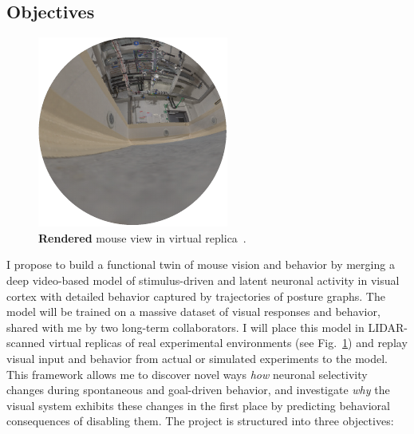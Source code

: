 \documentclass[COG,11pt]{ercgrant}
\begin{document}
\subsection{Objectives}
\begin{figure}
\vspace{-4ex}
\includegraphics[width=\linewidth]{figures/rendered.pdf}
\caption{\textbf{Rendered} mouse view in virtual replica~\parencite[from][]{Holmgren2021-jv}.}
\label{fig:replica}
\end{figure}
I propose to build a functional twin of mouse vision and behavior by merging a deep video-based model of stimulus-driven and latent neuronal activity in visual cortex with detailed behavior captured by trajectories of posture graphs. The model will be trained on a massive dataset of visual responses and behavior, shared with me by two long-term collaborators. I will place this model in LIDAR-scanned virtual replicas of real experimental environments (see Fig.~\ref{fig:replica}) and replay visual input and behavior from actual or simulated experiments to the model.
This framework allows me to discover novel ways \textit{how} neuronal selectivity  changes during spontaneous and goal-driven behavior, and investigate \textit{why} the visual system exhibits these changes in the first place by predicting behavioral consequences of disabling them. The project is structured into three objectives:
\end{document}
